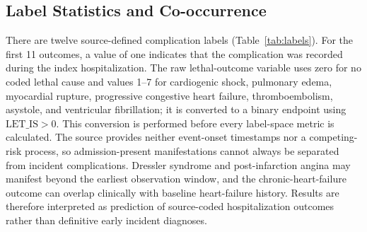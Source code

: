 \documentclass{ieeeaccess}
\begin{document}
\begin{table}[ht]
\caption{Feature Groups and Temporal Availability}
\label{tab:features}
\centering
\setlength{\tabcolsep}{3pt}
\end{table}

\subsection{Label Statistics and Co-occurrence}

There are twelve source-defined complication labels (Table~\ref{tab:labels}). For the first 11 outcomes, a value of one indicates that the complication was recorded during the index hospitalization. The raw lethal-outcome variable uses zero for no coded lethal cause and values 1--7 for cardiogenic shock, pulmonary edema, myocardial rupture, progressive congestive heart failure, thromboembolism, asystole, and ventricular fibrillation; it is converted to a binary endpoint using $\mathrm{LET\_IS}>0$. This conversion is performed before every label-space metric is calculated. The source provides neither event-onset timestamps nor a competing-risk process, so admission-present manifestations cannot always be separated from incident complications. Dressler syndrome and post-infarction angina may manifest beyond the earliest observation window, and the chronic-heart-failure outcome can overlap clinically with baseline heart-failure history. Results are therefore interpreted as prediction of source-coded hospitalization outcomes rather than definitive early incident diagnoses.
\end{document}
